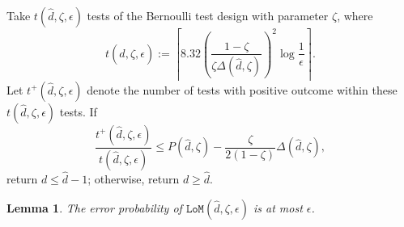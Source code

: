 \documentclass[onecolumn,letterpaper]{IEEEtran}
\newtheorem{lemma}{Lemma}
\newcommand{\lom}{{\texttt{LoM}}}
\newcommand{\lomerr}{{\epsilon}}
\newcommand{\ud}{{\hat{d}}}
\newcommand{\lomp}{{P}}
\newcommand{\lomcp}{{\zeta}}
\newcommand{\lomrs}{{t(\ud,\lomcp,\lomerr)}}
\newcommand{\lompo}{{t^{+}(\ud,\lomcp,\lomerr)}}
\newcommand{\lompp}{{\lomp(\ud,\lomcp)}}
\newcommand{\lompgap}{{\Delta(\ud,\lomcp)}}
\begin{document}
\begin{algorithm}
    \caption{$\lom(\ud,\lomcp,\lomerr)$}\label{algo:sub}
    \begin{algorithmic}[1]
    \State Take $\lomrs$ tests of the Bernoulli test design with parameter $\lomcp$, where
     \begin{equation} \label{eq:def:lomrs}
    \lomrs := \left\lceil 8.32 \left( \frac{1-\lomcp}{\lomcp \lompgap} \right)^2 \log \frac{1}{\lomerr} \right\rceil. 
     \end{equation}
    \State Let $\lompo$ denote the number of tests with positive outcome within these $\lomrs$ tests. If
    \begin{equation} \label{eq:lom_l}
        \frac{\lompo}{\lomrs} \le \lompp - \frac{\lomcp}{2(1-\lomcp)} \lompgap,
    \end{equation}
    return  $d \le \ud-1$; otherwise, return $d \ge \ud$.
    \end{algorithmic}
\end{algorithm}
\begin{lemma}\label{lem:sub:error}
The error probability of $\lom(\ud,\lomcp,\lomerr)$ is at most $\lomerr$.
\end{lemma}
\end{document}
